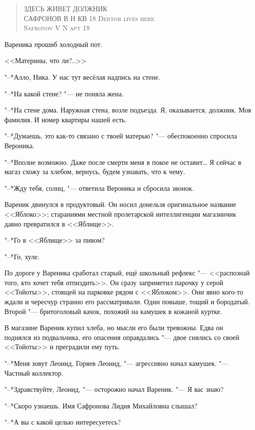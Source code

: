 \begin{quote}
{ЗДЕСЬ ЖИВЕТ ДОЛЖНИК\\
САФРОНОВ В Н КВ 18}
{\textsc{Debtor lives here\\
Safronov V N apt 18}}
\end{quote}

Вареника прошиб холодный пот.

<<Материны, что ли?..>>

"--*Алло, Ника.
У нас тут весёлая надпись на стене.

"--*На какой стене? "--- не поняла жена.

"--*На стене дома.
Наружная стена, возле подъезда.
Я, оказывается, должник.
Моя фамилия.
И номер квартиры нашей есть.

"--*Думаешь, это как-то связано с твоей матерью? "--- обеспокоенно спросила Вероника.

"--*Вполне возможно.
Даже после смерти меня в покое не оставит\ldots{}
Я сейчас в магаз схожу за хлебом, вернусь, будем узнавать, что к чему.

"--*Жду тебя, солнц, "--- ответила Вероника и сбросила звонок.

Вареник двинулся в продуктовый.
Он носил донельзя оригинальное название <<Яблоко>>;
стараниями местной пролетарской интеллигенции магазинчик давно превратился в <<Яблище>>.

"--*Го в <<Яблище>> за пивом?

"--*Го, хуле.

По дороге у Вареника сработал старый, ещё школьный рефлекс "--- <<распознай того, кто хочет тебя отпиздить>>.
Он сразу заприметил парочку у серой <<Тойоты>>, стоящей на парковке рядом с <<Яблоком>>.
Они явно кого-то ждали и чересчур странно его рассматривали.
Один повыше, тощий и бородатый.
Второй "--- бритоголовый качок, похожий на камушек в кожаной куртке.

В магазине Вареник купил хлеба, но мысли его были тревожны.
Едва он поднялся из подвальчика, его опасения оправдались "--- двое снялись со своей <<Тойоты>> и преградили ему путь.

\asterism

"--*Меня зовут Леонид, Горяев Леонид, "--- агрессивно начал камушек.
"--- Частный коллектор.

"--*Здравствуйте, Леонид, "--- осторожно начал Вареник.
"--- Я вас знаю?

"--*Скоро узнаешь.
Имя Сафронова Лидия Михайловна слышал?

"--*А вы с какой целью интересуетесь?

